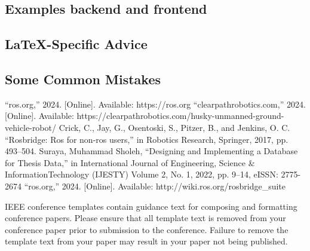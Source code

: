 \documentclass[conference]{IEEEtran}
\begin{document}
\subsection{Examples backend and frontend}

\subsection{\LaTeX-Specific Advice}



\subsection{Some Common Mistakes}

\begin{thebibliography}{00}
 “ros.org,”
2024.
[Online].
Available:
https://ros.org
 “clearpathrobotics.com,”
2024.
[Online].
Available:
https://clearpathrobotics.com/husky-unmanned-ground-vehicle-robot/
 Crick, C., Jay, G., Osentoski, S., Pitzer, B., and Jenkins, O. C. ``Rosbridge: Ros
for non-ros users,'' in Robotics Research, Springer, 2017, pp. 493--504.
 Suraya, Muhammad Sholeh, ``Designing and Implementing a Database for Thesis Data,'' in International Journal of Engineering, Science \& InformationTechnology (IJESTY)
Volume 2, No. 1, 2022, pp. 9--14, eISSN: 2775-2674
“ros.org,” 
2024.
[Online]. 
Available:
http://wiki.ros.org/rosbridge\_suite
\end{thebibliography}
\vspace{12pt}
\color{red}
IEEE conference templates contain guidance text for composing and formatting conference papers. Please ensure that all template text is removed from your conference paper prior to submission to the conference. Failure to remove the template text from your paper may result in your paper not being published.
\end{document}
